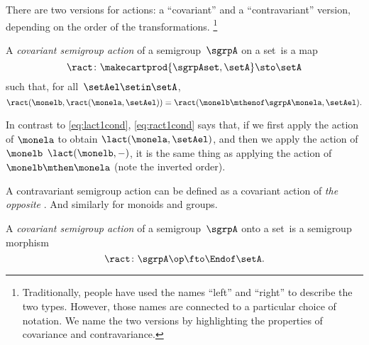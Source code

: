 There are two versions for actions: a ``covariant'' and a ``contravariant'' version, depending on the order of the transformations.
\footnote{
    Traditionally, people have used the names ``left'' and ``right'' to describe the two types.
    However, those names are connected to a particular choice of notation.
    We name the two versions by highlighting the properties of covariance and contravariance.
}

\begin{ctdefinition}
    \label{def:semigroup-contra-action-prelim}
    A \emph{covariant semigroup action} of a semigroup~$\sgrpA$ on a set~\setA is a map
    \begin{equation}
        \label{eq:ract}
        \ract \colon \makecartprod{\sgrpAset, \setA} \sto \setA
    \end{equation}
    such that, for all~$\setAel \setin \setA$,
    \begin{equation}
        \label{eq:ract1cond}
        \ract(\monelb, \ract(\monela, \setAel)) = \ract(\monelb \mthenof\sgrpA  \monela, \setAel).
    \end{equation}
\end{ctdefinition}

In contrast to \cref{eq:lact1cond},  \cref{eq:ract1cond} says that, if we first apply the action of $\monela$ to obtain $\lact(\monela, \setAel)$,
and then we apply the action of $\monelb$ $\lact(\monelb, -)$, it is the same thing as applying the action of $\monelb\mthen\monela$ (note the inverted order).

A contravariant semigroup action can be defined as a covariant action of \emph{the opposite} .
And similarly for monoids and groups.


\begin{ctdefinition}
    \label{def:semigroup-cont-action}
    A \emph{covariant semigroup action} of a semigroup~$\sgrpA$ onto a set~\setA is a semigroup morphism
    \begin{equation}
        \ract \colon \sgrpA\op \fto \Endof\setA.
    \end{equation}
\end{ctdefinition}

